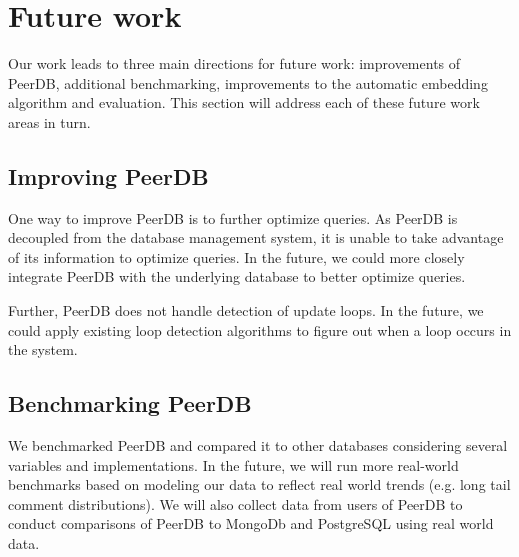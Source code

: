 \section{Future work}
Our work leads to three main directions for future work: improvements of PeerDB, additional benchmarking, improvements to the automatic embedding algorithm and evaluation.
This section will address each of these future work areas in turn.

\subsection{Improving PeerDB}
One way to improve PeerDB is to further optimize queries. As PeerDB is decoupled from the database management system, it is unable to take advantage of its information to optimize queries. In the future, we could more closely integrate PeerDB with the underlying database to better optimize queries. 

Further, PeerDB does not handle detection of update loops. In the future, we could apply existing loop detection algorithms to figure out when a loop occurs in the system.

\subsection{Benchmarking PeerDB}
We benchmarked PeerDB and compared it to other databases considering several variables and implementations. In the future, we will run more real-world benchmarks based on modeling our data to reflect real world trends (e.g. long tail comment distributions). 
We will also collect data from users of PeerDB to conduct comparisons of PeerDB to MongoDb and PostgreSQL using real world data.

